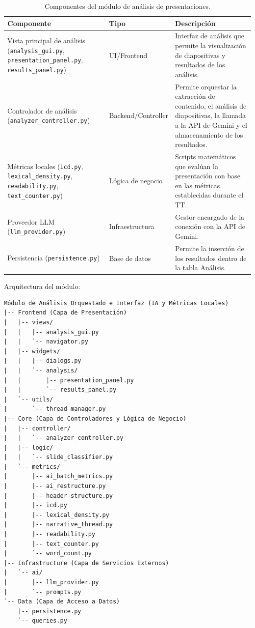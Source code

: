 \documentclass[11pt]{article}
\begin{document}
\begin{table}[H]
    \centering
    \begin{tabular}{|L{0.34\textwidth}|L{0.18\textwidth}|L{0.38\textwidth}|}
        \hline
        \textbf{Componente} & \textbf{Tipo} & \textbf{Descripción} \\ \hline
        Vista principal de análisis (\texttt{analysis\_gui.py}, \texttt{presentation\_panel.py}, \texttt{results\_panel.py}) & UI/Frontend & Interfaz de análisis que permite la visualización de diapositivas y resultados de los análisis. \\ \hline
        Controlador de análisis (\texttt{analyzer\_controller.py}) & Backend/Controller & Permite orquestar la extracción de contenido, el análisis de diapositivas, la llamada a la API de Gemini y el almacenamiento de los resultados. \\ \hline
        Métricas locales (\texttt{icd.py}, \texttt{lexical\_density.py}, \texttt{readability.py}, \texttt{text\_counter.py}) & Lógica de negocio & Scripts matemáticos que evalúan la presentación con base en las métricas establecidas durante el TT. \\ \hline
        Proveedor LLM (\texttt{llm\_provider.py}) & Infraestructura & Gestor encargado de la conexión con la API de Gemini. \\ \hline
        Persistencia (\texttt{persistence.py}) & Base de datos & Permite la inserción de los resultados dentro de la tabla Análisis. \\ \hline
    \end{tabular}
    \caption{Componentes del módulo de análisis de presentaciones.}
    \label{tab:componentes-modulo-analisis}
\end{table}

\newpage

Arquitectura del módulo:
\begin{verbatim}
Módulo de Análisis Orquestado e Interfaz (IA y Métricas Locales)
|-- Frontend (Capa de Presentación)
|   |-- views/
|   |   |-- analysis_gui.py
|   |   `-- navigator.py
|   |-- widgets/
|   |   |-- dialogs.py
|   |   `-- analysis/
|   |       |-- presentation_panel.py
|   |       `-- results_panel.py
|   `-- utils/
|       `-- thread_manager.py
|-- Core (Capa de Controladores y Lógica de Negocio)
|   |-- controller/
|   |   `-- analyzer_controller.py
|   |-- logic/
|   |   `-- slide_classifier.py
|   `-- metrics/
|       |-- ai_batch_metrics.py
|       |-- ai_restructure.py
|       |-- header_structure.py
|       |-- icd.py
|       |-- lexical_density.py
|       |-- narrative_thread.py
|       |-- readability.py
|       |-- text_counter.py
|       `-- word_count.py
|-- Infrastructure (Capa de Servicios Externos)
|   `-- ai/
|       |-- llm_provider.py
|       `-- prompts.py
`-- Data (Capa de Acceso a Datos)
    |-- persistence.py
    `-- queries.py
\end{verbatim}
\end{document}
